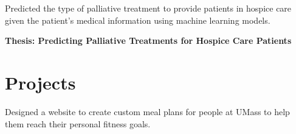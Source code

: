 \documentclass[letterpaper]{deedy-resume} %
\begin{document}
\begin{minipage}[t]{0.66\textwidth}
\sectionspace %




\begin{tightitemize}
\item Predicted the type of palliative treatment to provide patients in hospice care given the patient’s medical information using machine learning models. \\
\item \textbf{Thesis: Predicting Palliative Treatments for Hospice Care
Patients}
\end{tightitemize}

\sectionspace %


\section{\faWrench \hspace{1mm} Projects}



\begin{tightitemize}
\item Designed a website to create custom meal plans for people at UMass to help them reach their personal fitness goals. 
\end{tightitemize}
\sectionspace %






\end{minipage}
\end{document}
